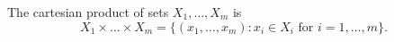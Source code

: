 The cartesian product of sets $X_1, \ldots, X_m$ is
$$X_1 \times \ldots \times X_m = \{(x_1, \ldots, x_m): x_i \in X_i \text{ for } i = 1, \ldots, m\}.$$
